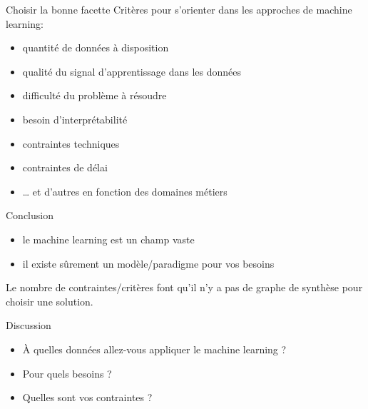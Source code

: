 \begin{frame}{Choisir la bonne facette}
  Critères pour s'orienter dans les approches de machine learning:
  \begin{itemize}[<+->]
  \item quantité de données à disposition
  \item qualité du signal d'apprentissage dans les données
  \item difficulté du problème à résoudre
  \item besoin d'interprétabilité
  \item contraintes techniques
  \item contraintes de délai
  \item … et d'autres en fonction des domaines métiers
  \end{itemize}
\end{frame}

\begin{frame}{Conclusion}
  \begin{itemize}
  \item le machine learning est un champ vaste
  \item il existe sûrement un modèle/paradigme pour vos besoins
  \end{itemize}
  Le nombre de contraintes/critères font qu'il n'y a pas de graphe de synthèse pour choisir une solution.
\end{frame}

\begin{frame}{Discussion}
  \begin{itemize}
  \item À quelles données allez-vous appliquer le machine learning ? 
  \item Pour quels besoins ?
  \item Quelles sont vos contraintes ?
  \end{itemize}
\end{frame}



